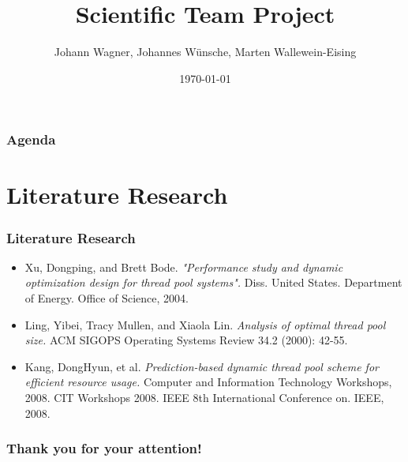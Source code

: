 \documentclass{beamer}
\title{Scientific Team Project}
\author{Johann Wagner, Johannes Wünsche, Marten Wallewein-Eising}
\date{\today}
\institute{Otto von Guericke University, Magdeburg}
\begin{document}
\begin{frame}[plain]
 \titlepage
\end{frame}



\section[Agenda]{}
\begin{frame}
\frametitle{Agenda}
\tableofcontents
\end{frame}

\section{Literature Research}
\begin{frame}
\frametitle{Literature Research}
\begin{itemize}
	\item Xu, Dongping, and Brett Bode. \emph{"Performance study and dynamic optimization design for thread pool systems".} Diss. United States. Department of Energy. Office of Science, 2004.
	\item Ling, Yibei, Tracy Mullen, and Xiaola Lin. \emph{Analysis of optimal thread pool size.} ACM SIGOPS Operating Systems Review 34.2 (2000): 42-55.
	\item Kang, DongHyun, et al. \emph{Prediction-based dynamic thread pool scheme for efficient resource usage.} Computer and Information Technology Workshops, 2008. CIT Workshops 2008. IEEE 8th International Conference on. IEEE, 2008.
\end{itemize}
\end{frame}

\begin{frame}
 \frametitle{Thank you for your attention!}
\end{frame}
\end{document}
